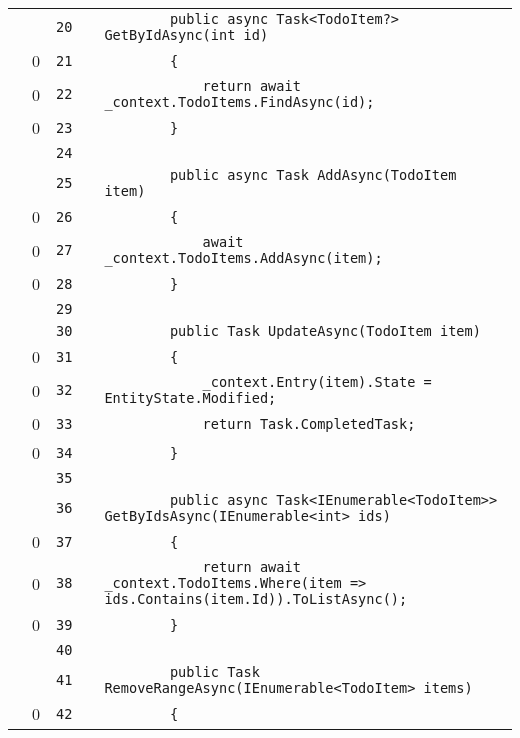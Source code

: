 \documentclass[a4paper,landscape,10pt]{article}
\begin{document}
\begin{longtable}[l]{lrrll}
\cellcolor{gray} &  & \verb~20~ & & \verb~        public async Task<TodoItem?> GetByIdAsync(int id)~\\
\cellcolor{red} & 0 & \verb~21~ & & \verb~        {~\\
\cellcolor{red} & 0 & \verb~22~ & & \verb~            return await _context.TodoItems.FindAsync(id);~\\
\cellcolor{red} & 0 & \verb~23~ & & \verb~        }~\\
\cellcolor{gray} &  & \verb~24~ & & \verb~~\\
\cellcolor{gray} &  & \verb~25~ & & \verb~        public async Task AddAsync(TodoItem item)~\\
\cellcolor{red} & 0 & \verb~26~ & & \verb~        {~\\
\cellcolor{red} & 0 & \verb~27~ & & \verb~            await _context.TodoItems.AddAsync(item);~\\
\cellcolor{red} & 0 & \verb~28~ & & \verb~        }~\\
\cellcolor{gray} &  & \verb~29~ & & \verb~~\\
\cellcolor{gray} &  & \verb~30~ & & \verb~        public Task UpdateAsync(TodoItem item)~\\
\cellcolor{red} & 0 & \verb~31~ & & \verb~        {~\\
\cellcolor{red} & 0 & \verb~32~ & & \verb~            _context.Entry(item).State = EntityState.Modified;~\\
\cellcolor{red} & 0 & \verb~33~ & & \verb~            return Task.CompletedTask;~\\
\cellcolor{red} & 0 & \verb~34~ & & \verb~        }~\\
\cellcolor{gray} &  & \verb~35~ & & \verb~~\\
\cellcolor{gray} &  & \verb~36~ & & \verb~        public async Task<IEnumerable<TodoItem>> GetByIdsAsync(IEnumerable<int> ids)~\\
\cellcolor{red} & 0 & \verb~37~ & & \verb~        {~\\
\cellcolor{red} & 0 & \verb~38~ & & \verb~            return await _context.TodoItems.Where(item => ids.Contains(item.Id)).ToListAsync();~\\
\cellcolor{red} & 0 & \verb~39~ & & \verb~        }~\\
\cellcolor{gray} &  & \verb~40~ & & \verb~~\\
\cellcolor{gray} &  & \verb~41~ & & \verb~        public Task RemoveRangeAsync(IEnumerable<TodoItem> items)~\\
\cellcolor{red} & 0 & \verb~42~ & & \verb~        {~\\

\end{longtable}
\end{document}
